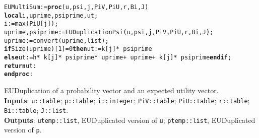 \vspace{-0.4cm}
\begin{alltt}
EUMultiSum := \textbf{proc}(u, psi, j, PiV, PiU, r, Bi, J) 
\textbf{local} i, uprime, psiprime, ut;
i := max(PiU[j]);
uprime, psiprime:=EUDuplicationPsi(u, psi, j, PiV, PiU, r, Bi, J);
uprime := convert(uprime, list);
\textbf{if} Size(uprime)[1] = 0 \textbf{then}  ut := k[j]*~psiprime 
\textbf{else} ut := h*~k[j]*~psiprime*~uprime+~uprime+~k[j]*~psiprime \textbf{end if};
\textbf{return} ut: 
\textbf{end proc}:
\end{alltt}


\noindent EUDuplication of a probability vector and an expected utility vector. \\
\textbf{Inputs}: \verb|u::table|; \verb|p::table|; \verb|i::integer|; \verb|PiV::table|; \verb|PiU::table|; 
  \verb|r::table|;\\
   \verb|Bi::table|; \verb|J::list|.\\
  \textbf{Outputs}: \verb|utemp::list|, EUDuplicated version of \verb|u|;
\verb|ptemp::list|, EUDuplicated version of \verb|p|.

